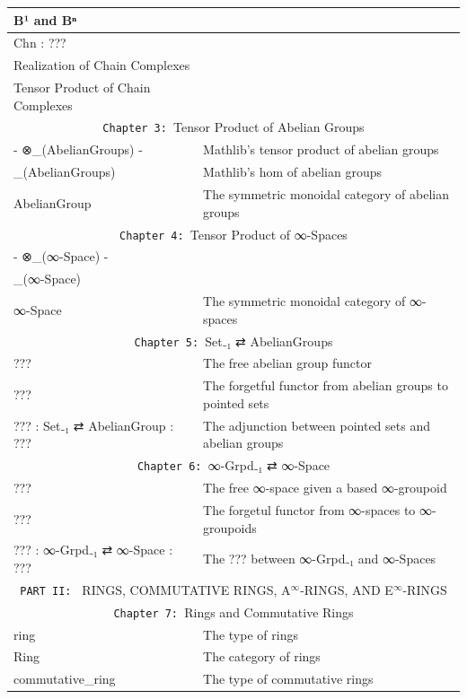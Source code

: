 \documentclass{book}
\theoremstyle{definition}
\begin{document}
{\begin{longtable}{|| l || l ||}
\hline
B¹ and Bⁿ & \\
\hline
Chn : ??? & \\
\hline
Realization of Chain Complexes & \\
\hline
Tensor Product of Chain Complexes & \\
\hline \hline
\multicolumn{2}{||c||}{\texttt{Chapter 3: }Tensor Product of Abelian Groups} \\
\hline \hline
- ⊗\_(AbelianGroups) - & Mathlib's tensor product of abelian groups \\
\hline
[-,-]\_(AbelianGroups) & Mathlib's hom of abelian groups\\
\hline
AbelianGroup & The symmetric monoidal category of abelian groups\\
\hline \hline
\multicolumn{2}{||c||}{\texttt{Chapter 4: }Tensor Product of ∞-Spaces} \\
\hline \hline
- ⊗\_(∞-Space) - &  \\
\hline
[-,-]\_(∞-Space) &  \\
\hline
∞-Space & The symmetric monoidal category of ∞-spaces \\
\hline \hline
 \multicolumn{2}{||c||}{\texttt{Chapter 5: }Set₋₁ ⇄ AbelianGroups} \\
\hline \hline
??? & The free abelian group functor \\
 \hline
??? & The forgetful functor from abelian groups to pointed sets \\
 \hline
??? : Set₋₁ ⇄ AbelianGroup : ??? & The adjunction between pointed sets and abelian groups \\
\hline \hline
 \multicolumn{2}{||c||}{\texttt{Chapter 6: }∞-Grpd₋₁ ⇄ ∞-Space} \\
\hline \hline
??? & The free ∞-space given a based ∞-groupoid \\
\hline
??? & The forgetul functor from ∞-spaces to ∞-groupoids \\
\hline
??? : ∞-Grpd₋₁ ⇄ ∞-Space : ??? & The ??? between ∞-Grpd₋₁ and ∞-Spaces \\
\hline \hline
\multicolumn{2}{||c||}{\texttt{PART II: } RINGS, COMMUTATIVE RINGS, A${}^{\infty}$-RINGS, AND E${}^{\infty}$-RINGS} \\
\hline \hline
\multicolumn{2}{||c||}{\texttt{Chapter 7: }Rings and Commutative Rings} \\
\hline \hline
ring & The type of rings \\
 \hline
Ring & The category of rings \\
\hline
commutative\_ring & The type of commutative rings  \\

\end{longtable}}
\end{document}
